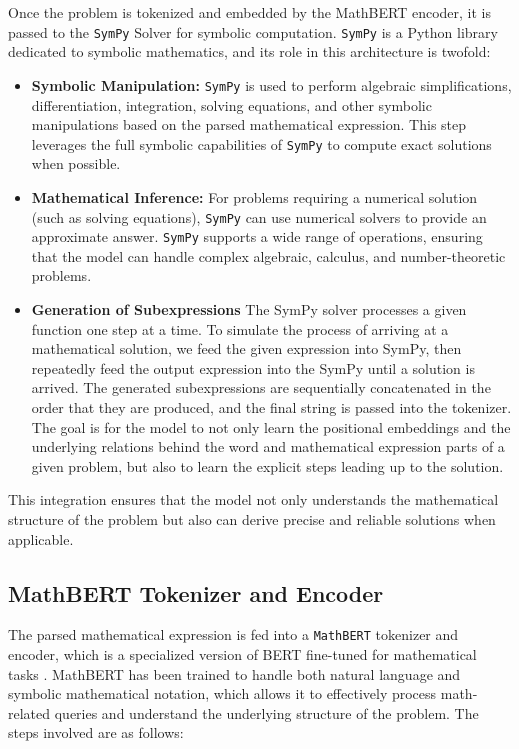 \documentclass{article}
\begin{document}
Once the problem is tokenized and embedded by the MathBERT encoder, it is passed to the \texttt{SymPy} Solver for symbolic computation. \texttt{SymPy} is a Python library dedicated to symbolic mathematics, and its role in this architecture is twofold:

\begin{itemize}
    \item \textbf{Symbolic Manipulation:} \texttt{SymPy} is used to perform algebraic simplifications, differentiation, integration, solving equations, and other symbolic manipulations based on the parsed mathematical expression. This step leverages the full symbolic capabilities of \texttt{SymPy} to compute exact solutions when possible.
    \item \textbf{Mathematical Inference:} For problems requiring a numerical solution (such as solving equations), \texttt{SymPy} can use numerical solvers to provide an approximate answer. \texttt{SymPy} supports a wide range of operations, ensuring that the model can handle complex algebraic, calculus, and number-theoretic problems.
    \item \textbf{Generation of Subexpressions} The SymPy solver processes a given function one step at a time. To simulate the process of arriving at a mathematical solution, we feed the given expression into SymPy, then repeatedly feed the output expression into the SymPy until a solution is arrived. The generated subexpressions are sequentially concatenated in the order that they are produced, and the final string is passed into the tokenizer. The goal is for the model to not only learn the positional embeddings and the underlying relations behind the word and mathematical expression parts of a given problem, but also to learn the explicit steps leading up to the solution. 
\end{itemize}

This integration ensures that the model not only understands the mathematical structure of the problem but also can derive precise and reliable solutions when applicable.

\subsection{MathBERT Tokenizer and Encoder}

The parsed mathematical expression is fed into a \texttt{MathBERT} tokenizer and encoder, which is a specialized version of BERT fine-tuned for mathematical tasks \cite{mathbert}. MathBERT has been trained to handle both natural language and symbolic mathematical notation, which allows it to effectively process math-related queries and understand the underlying structure of the problem. The steps involved are as follows:
\end{document}
